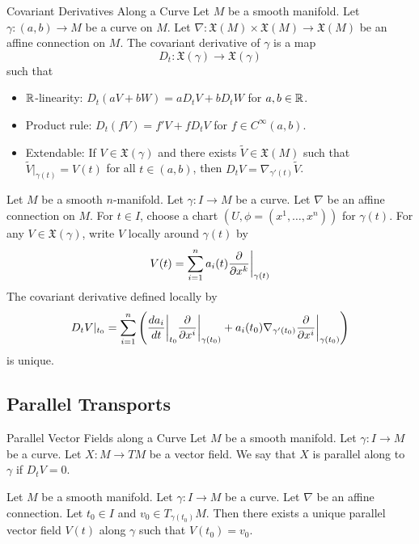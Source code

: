 \documentclass[a4paper]{article}
\begin{document}
\begin{defn}{Covariant Derivatives Along a Curve}{} Let $M$ be a smooth manifold. Let $\gamma:(a,b)\to M$ be a curve on $M$. Let $\nabla:\mathfrak{X}(M)\times\mathfrak{X}(M)\to\mathfrak{X}(M)$ be an affine connection on $M$. The covariant derivative of $\gamma$ is a map $$D_t:\mathfrak{X}(\gamma)\to\mathfrak{X}(\gamma)$$ such that 
\begin{itemize}
\item $\mathbb{R}$-linearity: $D_t(aV+bW)=aD_tV+bD_tW$ for $a,b\in\mathbb{R}$. 
\item Product rule: $D_t(fV)=f'V+fD_tV$ for $f\in C^\infty(a,b)$. 
\item Extendable: If $V\in\mathfrak{X}(\gamma)$ and there exists $\tilde{V}\in\mathfrak{X}(M)$ such that $\tilde{V}|_{\gamma(t)}=V(t)$ for all $t\in(a,b)$, then $D_tV=\nabla_{\gamma'(t)}\tilde{V}$. 
\end{itemize}
\end{defn}

\begin{thm}{}{} Let $M$ be a smooth $n$-manifold. Let $\gamma:I\to M$ be a curve. Let $\nabla$ be an affine connection on $M$. For $t\in I$, choose a chart $(U,\phi=(x^1,\dots,x^n))$ for $\gamma(t)$. For any $V\in\mathfrak{X}(\gamma)$, write $V$ locally around $\gamma(t)$ by $$V(t)=\sum_{i=1}^na_i(t)\frac{\partial}{\partial x^k}\bigg{|}_{\gamma(t)}$$ The covariant derivative defined locally by $$D_tV|_{t_0}=\sum_{i=1}^n\left(\frac{da_i}{dt}\bigg{|}_{t_0}\frac{\partial}{\partial x^i}\bigg{|}_{\gamma(t_0)}+a_i(t_0)\nabla_{\gamma'(t_0)}\frac{\partial}{\partial x^i}\bigg{|}_{\gamma(t_0)}\right)$$ is unique. 
\end{thm}

\subsection{Parallel Transports}
\begin{defn}{Parallel Vector Fields along a Curve}{} Let $M$ be a smooth manifold. Let $\gamma:I\to M$ be a curve. Let $X:M\to TM$ be a vector field. We say that $X$ is parallel along to $\gamma$ if $D_tV=0$. 
\end{defn}

\begin{thm}{}{} Let $M$ be a smooth manifold. Let $\gamma:I\to M$ be a curve. Let $\nabla$ be an affine connection. Let $t_0\in I$ and $v_0\in T_{\gamma(t_0)}M$. Then there exists a unique parallel vector field $V(t)$ along $\gamma$ such that $V(t_0)=v_0$. 
\end{thm}
\end{document}
